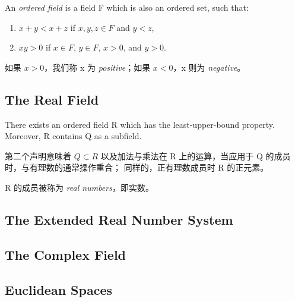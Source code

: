 \documentclass[../poma-note.tex]{subfiles}
\begin{document}
\setcounter{definition}{16}
\begin{definition}
	An \textit{ordered field} is a field F which is also an ordered set, such that:

	\begin{enumerate}
		\item $x+y<x+z$ if $x,y,z \in F$ and $y<z$,
		\item $xy>0$ if $x \in F$, $y \in F$, $x>0$, and $y>0$.
	\end{enumerate}
\end{definition}

如果 $x>0$，我们称 x 为 \textit{positive}；如果 $x<0$，x 则为 \textit{negative}。

\subsection*{The Real Field}

\setcounter{theorem}{18}
\begin{theorem}
	There exists an ordered field R which has the least-upper-bound property.
	Moreover, R contains Q as a subfield.
\end{theorem}

第二个声明意味着 $Q \subset R$ 以及加法与乘法在 R 上的运算，当应用于 Q 的成员时，与有理数的通常操作重合；
同样的，正有理数成员时 R 的正元素。

R 的成员被称为 \textit{real numbers}，即实数。


\subsection*{The Extended Real Number System}

\subsection*{The Complex Field}

\subsection*{Euclidean Spaces}
\end{document}
